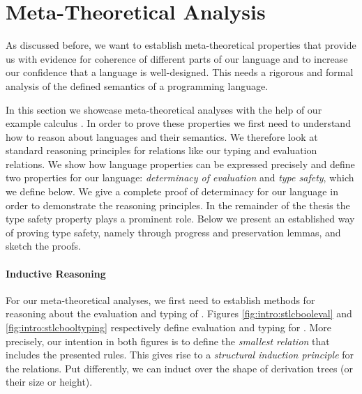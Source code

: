 {%
\section{Meta-Theoretical Analysis}\label{sec:intro:typesafety}


As discussed before, we want to establish meta-theoretical properties that
provide us with evidence for coherence of different parts of our language and to
increase our confidence that a language is well-designed. This needs a rigorous
and formal analysis of the defined semantics of a programming language.

In this section we showcase meta-theoretical analyses with the help of our
example calculus \stlcbool. In order to prove these properties we first need to
understand how to reason about languages and their semantics. We therefore look
at standard reasoning principles for relations like our typing and evaluation
relations. We show how language properties can be expressed precisely and define
two properties for our language: \emph{determinacy of evaluation} and \emph{type
  safety}, which we define below. We give a complete proof of determinacy for
our language in order to demonstrate the reasoning principles. In the remainder
of the thesis the type safety property plays a prominent role. Below we present
an established way of proving type safety, namely through progress and
preservation lemmas, and sketch the proofs.


\paragraph{Inductive Reasoning}
For our meta-theoretical analyses, we first need to establish methods for
reasoning about the evaluation and typing of \stlcbool. Figures
\ref{fig:intro:stlcbooleval} and \ref{fig:intro:stlcbooltyping} respectively
define evaluation and typing for \stlcbool. More precisely, our intention in
both figures is to define the \emph{smallest relation} that includes the
presented rules. This gives rise to a \emph{structural induction principle} for
the relations. Put differently, we can induct over the shape of derivation trees
(or their size or height).

}
